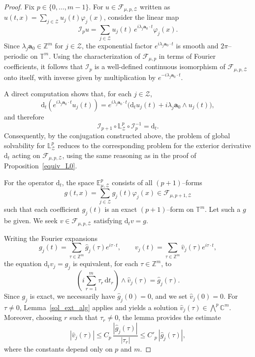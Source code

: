 \documentclass[10pt,a4paper]{amsart}
\begin{document}
\begin{proof}
	Fix $p\in\{0,\dots,m-1\}$. For $u\in\mathscr{F}_{\mu,p,\mathcal{Z}}$ written as
	$u(t,x)=\sum_{j\in\mathcal{Z}}u_j(t)\varphi_j(x)$,
	consider the linear map
	\[
	\mathscr{I}_p u
	=
	\sum_{j\in\mathcal{Z}}u_j(t)\,e^{i\lambda_j\boldsymbol{a}_0\cdot t}\varphi_j(x).
	\]
	Since $\lambda_j\boldsymbol{a}_0\in\mathbb{Z}^m$ for $j\in\mathcal{Z}$,
	the exponential factor $e^{i\lambda_j\boldsymbol{a}_0\cdot t}$ is smooth and
	$2\pi$--periodic on $\mathbb{T}^m$.
	Using the characterization of $\mathscr{F}_{\mu,p}$ in terms of Fourier
	coefficients, it follows that $\mathscr{I}_p$ is a well-defined continuous
	isomorphism of $\mathscr{F}_{\mu,p,\mathcal{Z}}$ onto itself, with inverse
	given by multiplication by $e^{-i\lambda_j\boldsymbol{a}_0\cdot t}$.
	
	A direct computation shows that, for each $j\in\mathcal{Z}$,
	\[
	\mathrm{d}_t\!\left(e^{i\lambda_j\boldsymbol{a}_0\cdot t}u_j(t)\right)
	=
	e^{i\lambda_j\boldsymbol{a}_0\cdot t}
	\bigl(\mathrm{d}_t u_j(t)+ i\lambda_j \boldsymbol{a}_0\wedge u_j(t)\bigr),
	\]
	and therefore
	\[
	\mathscr{I}_{p+1}\circ\mathbb{L}^p_{\mathcal{Z}}\circ\mathscr{I}_p^{-1}
	=
	\mathrm{d}_t.
	\]
	Consequently, by the conjugation constructed above, the problem of global solvability for $\mathbb{L}^p_{\mathcal{Z}}$ reduces to the corresponding problem for the exterior derivative $\mathrm{d}_t$ acting on $\mathscr{F}_{\mu,p,\mathcal{Z}}$, using the same reasoning as in the proof of Proposition~\ref{equiv_L0}.

	
	For the operator $\mathrm{d}_t$, the space $\mathbb{E}^p_{\mu,\mathcal{Z}}$
	consists of all $(p+1)$--forms
	\[
	g(t,x)=\sum_{j\in\mathcal{Z}} g_j(t)\varphi_j(x)
	\in\mathscr{F}_{\mu,p+1,\mathcal{Z}}
	\]
	such that each coefficient $g_j(t)$ is an exact $(p+1)$--form on $\mathbb{T}^m$.
	Let such a $g$ be given. 	We seek $v\in\mathscr{F}_{\mu,p,\mathcal{Z}}$ satisfying
	\(\mathrm{d}_t v = g.\)
	
	Writing the Fourier expansions
	\[
	g_j(t)=\sum_{\tau\in\mathbb{Z}^m}\widehat g_j(\tau)e^{i\tau\cdot t},
	\qquad
	v_j(t)=\sum_{\tau\in\mathbb{Z}^m}\widehat v_j(\tau)e^{i\tau\cdot t},
	\]
	the equation $\mathrm{d}_t v_j=g_j$ is equivalent, for each $\tau\in\mathbb{Z}^m$, to
	\[
	\left(i\sum_{r=1}^m\tau_r\,\mathrm{d}t_r\right)\wedge \widehat v_j(\tau)
	=
	\widehat g_j(\tau).
	\]
		Since $g_j$ is exact, we necessarily have $\widehat g_j(0)=0$,
	and we set $\widehat v_j(0)=0$.
	For $\tau\neq0$, Lemma~\ref{sol_ext_alg} applies and yields a solution
	$\widehat v_j(\tau)\in\textstyle\bigwedge^p\mathbb{C}^m$.
	Moreover, choosing $r$ such that $\tau_r\neq0$, the lemma provides the estimate
	\[
	|\widehat v_j(\tau)|
	\le
	C_p\,\frac{|\widehat g_j(\tau)|}{|\tau_r|}
	\le
	C'_p\,|\widehat g_j(\tau)|,
	\]
	where the constants depend only on $p$ and $m$.
	

\end{proof}
\end{document}
